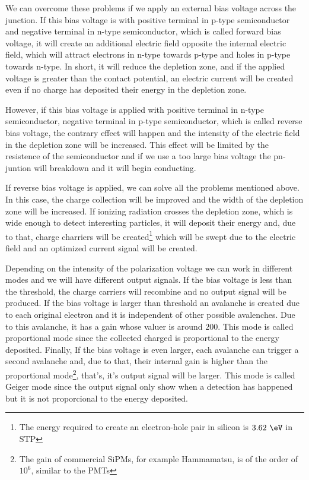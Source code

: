 We can overcome these problems if we apply an external bias voltage across the junction. If this bias voltage is with positive terminal in p-type semiconductor and negative terminal in n-type semiconductor, which is called forward bias voltage, it will create an additional electric field opposite the internal electric field, which will attract electrons in n-type towards p-type and holes in p-type towards n-type. In short, it will reduce the depletion zone, and if the applied voltage is greater than the contact potential, an electric current will be created even if no charge has deposited their energy in the depletion zone.

However, if this bias voltage is applied with positive terminal in n-type semiconductor, negative terminal in p-type semiconductor, which is called reverse bias voltage, the contrary effect will happen and the intensity of the electric field in the depletion zone will be increased. This effect will be limited by the resistence of the semiconductor and if we use a too large bias voltage the pn-juntion will breakdown and it will begin conducting. 

If reverse bias voltage is applied, we can solve all the problems mentioned above. In this case, the charge collection will be improved and the width of the depletion zone will be increased. If ionizing radiation crosses the depletion zone, which is wide enough to detect interesting particles, it will deposit their energy and, due to that, charge charriers will be created\footnote{The energy required to create an electron-hole pair in silicon is $3.62~\eV$ in STP\cite{Leo}} which will be swept due to the electric field and an optimized current signal will be created. 

Depending on the intensity of the polarization voltage we can work in different modes and we will have different output signals. If the bias voltage is less than the threshold, the charge carriers will recombine and no output signal will be produced. If the bias voltage is larger than threshold an avalanche is created due to each original electron and it is independent of other possible avalenches. Due to this avalanche, it has a gain whose valuer is around $200$. This mode is called proportional mode since the collected charged is proportional to the energy deposited. Finally, If the bias voltage is even larger, each avalanche can trigger a second avalanche and, due to that, their internal gain is higher than the proportional mode\footnote{The gain of commercial SiPMs, for example Hammamatsu, is of the order of $10^6$, similar to the PMTs}, that's, it's output signal will be larger. This mode is called Geiger mode since the output signal only show when a detection has happened but it is not proporcional to the energy deposited. 

